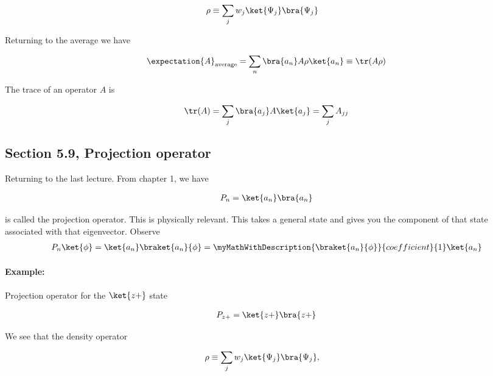 \begin{align}\label{eqn:PHY356HNov2:40}
\rho &\equiv \sum_j w_j \ket{\Psi_j} \bra{\Psi_j}
\end{align}

Returning to the average we have

\begin{align}\label{eqn:PHY356HNov2:50}
\expectation{A}_{\text{average}} = \sum_n \bra{a_n} A \rho \ket{a_n} \equiv \tr(A \rho)
\end{align}

The trace of an operator $A$ is

\begin{align}\label{eqn:PHY356HNov2:60}
\tr(A) = \sum_j \bra{a_j} A \ket{a_j} = \sum_j A_{jj}
\end{align}

\subsection{Section 5.9, Projection operator}

Returning to the last lecture.  From chapter 1, we have

\begin{align}\label{eqn:PHY356Foct26:1000}
P_n = \ket{a_n} \bra{a_n}
\end{align}

is called the projection operator.  This is physically relevant.  This takes a general state and gives you the component of that state associated with that eigenvector.  Observe
\begin{align}\label{eqn:PHY356Foct26:210}
P_n \ket{\phi} =
\ket{a_n} \braket{a_n}{\phi}
=
\myMathWithDescription{\braket{a_n}{\phi}}{coefficient}{1} \ket{a_n}
\end{align}

\paragraph{Example:} Projection operator for the $\ket{z+}$ state

\begin{align}\label{eqn:PHY356Foct26:211}
P_{z+} = \ket{z+} \bra{z+}
\end{align}

We see that the density operator

\begin{align}\label{eqn:PHY356HNov2:40b}
\rho &\equiv \sum_j w_j \ket{\Psi_j} \bra{\Psi_j},
\end{align}

